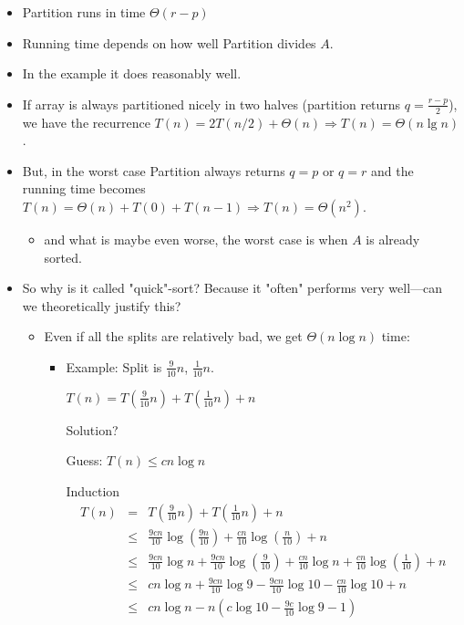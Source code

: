 \documentclass[11pt]{article}
\begin{document}
	      \begin{itemize}
	      \item {\sc Partition} runs in time $\Theta(r-p)$
		
	      \item Running time depends on how well {\sc Partition} divides $A$.
	      \item In the example it does reasonably well.
		
	      \item If array is always partitioned nicely in two halves (partition
		returns $q=\frac{r-p}{2}$), we have the recurrence $T(n) =
		2T(n/2) + \Theta(n) \Rightarrow T(n) = \Theta(n\lg n)$.
		
		
	      \item But, in the worst case {\sc Partition} always returns $q = p$
		or $q=r$ and the running time becomes $T(n)=\Theta(n)+T(0)+T(n-1)
		\Rightarrow T(n)=\Theta(n^2)$.
		\begin{itemize}
		\item and what is maybe even worse, the worst case is when $A$
		  is already sorted.
		\end{itemize}
	      	      
	      \item So why is it called "quick"-sort? Because it
	      "often" performs very well---can we theoretically
	      justify this?
	      \begin{itemize}
	      \item Even if all the splits are relatively bad, we get
		$\Theta(n\log n)$ time:
		\begin{itemize}
		\item Example: Split is $\frac{9}{10}n$, $\frac{1}{10}n$.
		  
		  $T(n) = T(\frac{9}{10} n) + T(\frac{1}{10} n) + n$
		  
		  Solution?
		  
		  Guess: $T(n) \leq cn\log n$
		  
		  Induction
		  \begin{eqnarray*}
		    T(n) & = & T(\frac{9}{10} n) + T(\frac{1}{10} n) + n \\
		    & \leq & \frac{9cn}{10}\log (\frac{9n}{10}) +
		    \frac{cn}{10}\log (\frac{n}{10}) + n \\
		    & \leq & \frac{9cn}{10}\log n + \frac{9cn}{10} \log
		    (\frac{9}{10}) + \frac{cn}{10}\log n + \frac{cn}{10}\log
		    (\frac{1}{10}) + n \\
		    & \leq & cn\log n + \frac{9cn}{10} \log 9 - \frac{9cn}{10}
		    \log 10 - \frac{cn}{10}\log 10 + n \\
		    & \leq & cn\log n - n(c\log 10 - \frac{9c}{10} \log 9 - 1) \\
		  \end{eqnarray*}
		  

\end{itemize}
\end{itemize}
\end{itemize}
\end{document}
